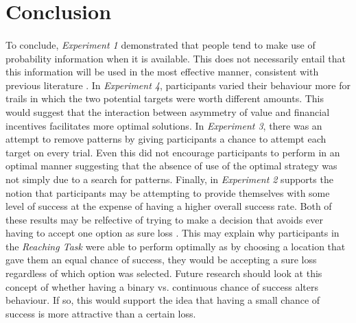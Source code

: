 \documentclass[12pt]{article}
\begin{document}
\section*{Conclusion}
\paragraph{} To conclude, \textit{Experiment 1} demonstrated that people tend to make use of probability information when it is available. This does not necessarily entail that this information will be used in the most effective manner, consistent with previous literature \citep{koehler2014probability}. In \textit{Experiment 4}, participants varied their behaviour more for trails in which the two potential targets were worth different amounts. This would suggest that the interaction between asymmetry of value and financial incentives facilitates more optimal solutions. In \textit{Experiment 3}, there was an attempt to remove patterns by giving participants a chance to attempt each target on every trial. Even this did not encourage participants to perform in an optimal manner suggesting that the absence of use of the optimal strategy was not simply due to a search for patterns. Finally, in \textit{Experiment 2} supports the notion that participants may be attempting to provide themselves with some level of success at the expense of having a higher overall success rate. Both of these results may be relfective of trying to make a decision that avoids ever having to accept one option as sure loss \cite{CHAPMAN2010168,KahnemanProspect,Hudson2007probmove}. This may explain why participants in the \textit{Reaching Task} \citep{clarke2015failure} were able to perform optimally as by choosing a location that gave them an equal chance of success, they would be accepting a sure loss regardless of which option was selected. Future research should look at this concept of whether having a binary vs. continuous chance of success alters behaviour. If so, this would support the idea that having a small chance of success is more attractive than a certain loss.

\clearpage
\begingroup\onehalfspacing
\newpage
{}


\endgroup
\end{document}
